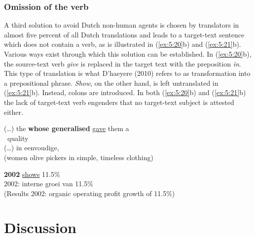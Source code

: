 \documentclass[output=paper]{LSP/langsci}
\begin{document}
\subsubsection{Omission of the verb} \label{sec:5:6:2:3}

A third solution to avoid Dutch non-human agents is chosen by translators in almost five percent of all Dutch translations and leads to a target-text sentence which does not contain a verb, as is illustrated in (\ref{ex:5:20}b) and (\ref{ex:5:21}b). Various ways exist through which this solution can be established. In (\ref{ex:5:20}b), the source-text verb \textit{give} is replaced in the target text with the preposition \textit{in}. This type of translation is what D’haeyere (2010) refers to as transformation into a prepositional phrase. \textit{Show}, on the other hand, is left untranslated in (\ref{ex:5:21}b). Instead, colons are introduced. In both (\ref{ex:5:20}b) and (\ref{ex:5:21}b) the lack of target-text verb engenders that no target-text subject is attested either.     


\ea \label{ex:5:20} 
\ea
(\dots) the  \textbf{whose generalised}  \ul{gave} them a \\\, quality\\[1em]
\ex
(\dots)  in eenvoudige,  \\
(women olive pickers in simple, timeless clothing)
\z
\z


\ea \label{ex:5:21}
\ea
\textbf{2002}  \ul{shows} 11.5\% \\[1em]
\ex {} 2002: interne groei  van 11.5\%\\
(Results 2002: organic operating profit growth of 11.5\%)
\z
\z




\section{Discussion}
\end{document}
